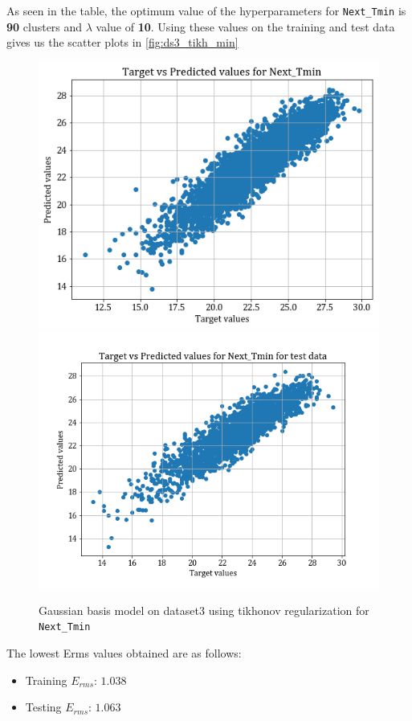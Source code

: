 \documentclass[12pt,a4paper]{article}
\newcommand{\noi}{\noindent}
\def\tt#1{\texttt{#1}}
\begin{document}
\noi
As seen in the table, the optimum value of the hyperparameters for  \tt{Next\_Tmin} is \textbf{90} clusters and $\lambda$ value of \textbf{10}. Using these values on the training and test data gives us the scatter plots in \autoref{fig:ds3_tikh_min}
\begin{figure}
    \centering
    \includegraphics[scale=0.4]{images/train_ds3_tikh_min.png}
    \includegraphics[scale=0.4]{images/test_ds3_tikh_min.png}
    \caption{Gaussian basis model on dataset3 using tikhonov regularization for \tt{Next\_Tmin}}
    \label{fig:ds3_tikh_min}
\end{figure}
The lowest Erms values obtained are as follows:
\begin{itemize}
    \itemsep0em
    \item Training $E_{rms}$: $1.038$
    \item Testing $E_{rms}$: $1.063$
\end{itemize}
\end{document}

